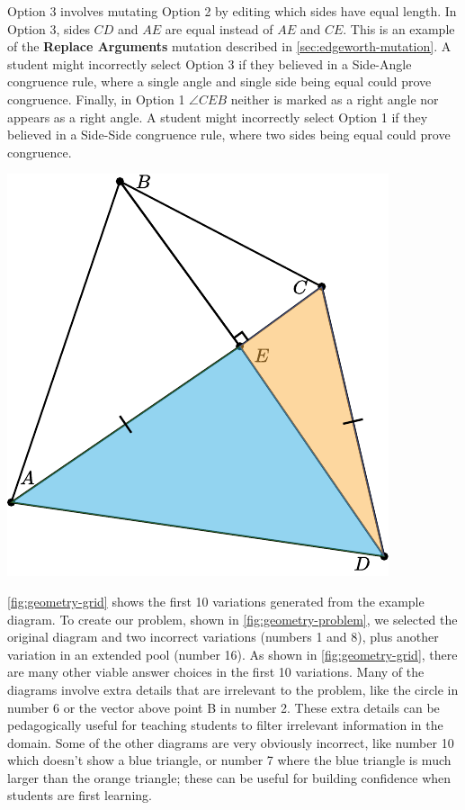 Option 3 involves mutating Option 2 by editing which sides have equal length. In Option 3, sides $CD$ and $AE$ are equal instead of $AE$ and $CE$. This is an example of the \textbf{Replace Arguments} mutation described in \cref{sec:edgeworth-mutation}. A student might incorrectly select Option 3 if they believed in a Side-Angle congruence rule, where a single angle and single side being equal could prove congruence. Finally, in Option 1 $\angle CEB$ neither is marked as a right angle nor appears as a right angle. A student might incorrectly select Option 1 if they believed in a Side-Side congruence rule, where two sides being equal could prove congruence.

\begin{center}
   \includegraphics[width=.3\linewidth]{assets/edgeworth/congruent-triangles-opt-3.pdf}
\end{center}

\cref{fig:geometry-grid} shows the first 10 variations \Edgeworth generated from the example diagram. To create our problem, shown in \cref{fig:geometry-problem}, we selected the original diagram and two incorrect variations (numbers 1 and 8), plus another variation in an extended pool (number 16). As shown in \cref{fig:geometry-grid}, there are many other viable answer choices in the first 10 variations. Many of the diagrams involve extra details that are irrelevant to the problem, like the circle in number 6 or the vector above point B in number 2. These extra details can be pedagogically useful for teaching students to filter irrelevant information in the domain. Some of the other diagrams are very obviously incorrect, like number 10 which doesn't show a blue triangle, or number 7 where the blue triangle is much larger than the orange triangle; these can be useful for building confidence when students are first learning. 

